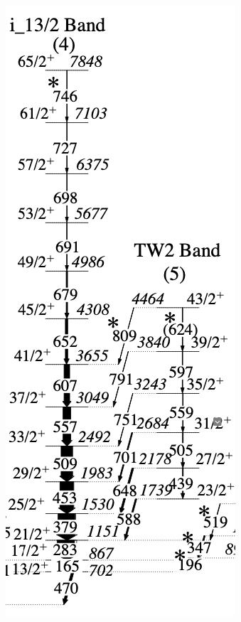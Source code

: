 \documentclass[12pt, a4paper]{article}
\begin{document}
\begin{figure}[ht]
    \includegraphics[scale=0.3]{figs/positive_Au183.png}\hspace{1.5cm}

\end{figure}
\end{document}
